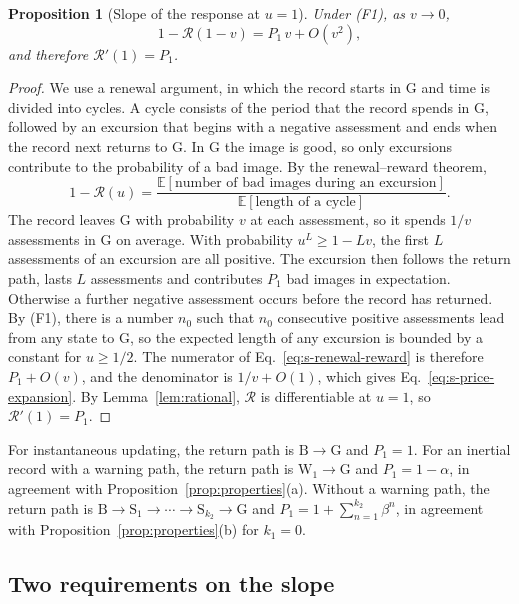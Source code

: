 \documentclass[10pt]{wlscirep}
\newcommand{\Rmap}{\mathscr{R}}            %
\newcommand{\st}[1]{\mathrm{#1}}           %
\newcommand{\Pone}{P_{1}}                  %
\theoremstyle{plain}
\newtheorem{proposition}[lemma]{Proposition}
\theoremstyle{remark}
\begin{document}
\begin{proposition}[Slope of the response at $u=1$]\label{prop:price}
Under (F1), as $v\to0$,
\begin{equation}
1-\Rmap(1-v)=\Pone\,v+O(v^2),
\label{eq:s-price-expansion}
\end{equation}
and therefore $\Rmap'(1)=\Pone$.
\end{proposition}
\begin{proof}
We use a renewal argument, in which the record starts in $\st G$ and time is divided into cycles. A cycle consists of the period that the record spends in $\st G$, followed by an excursion that begins with a negative assessment and ends when the record next returns to $\st G$. In $\st G$ the image is good, so only excursions contribute to the probability of a bad image. By the renewal--reward theorem,
\begin{equation}
1-\Rmap(u)=\frac{\mathbb E[\text{number of bad images during an excursion}]}{\mathbb E[\text{length of a cycle}]}.
\label{eq:s-renewal-reward}
\end{equation}
The record leaves $\st G$ with probability $v$ at each assessment, so it spends $1/v$ assessments in $\st G$ on average. With probability $u^{L}\geq1-Lv$, the first $L$ assessments of an excursion are all positive. The excursion then follows the return path, lasts $L$ assessments and contributes $\Pone$ bad images in expectation. Otherwise a further negative assessment occurs before the record has returned. By (F1), there is a number $n_0$ such that $n_0$ consecutive positive assessments lead from any state to $\st G$, so the expected length of any excursion is bounded by a constant for $u\geq1/2$. The numerator of Eq.~\eqref{eq:s-renewal-reward} is therefore $\Pone+O(v)$, and the denominator is $1/v+O(1)$, which gives Eq.~\eqref{eq:s-price-expansion}. By Lemma~\ref{lem:rational}, $\Rmap$ is differentiable at $u=1$, so $\Rmap'(1)=\Pone$.
\end{proof}

For instantaneous updating, the return path is $\st B\to\st G$ and $\Pone=1$. For an inertial record with a warning path, the return path is $\st W_1\to\st G$ and $\Pone=1-\alpha$, in agreement with Proposition~\ref{prop:properties}(a). Without a warning path, the return path is $\st B\to\st S_1\to\cdots\to\st S_{k_2}\to\st G$ and $\Pone=1+\sum_{n=1}^{k_2}\beta^n$, in agreement with Proposition~\ref{prop:properties}(b) for $k_1=0$.

\subsection{Two requirements on the slope}
\end{document}

